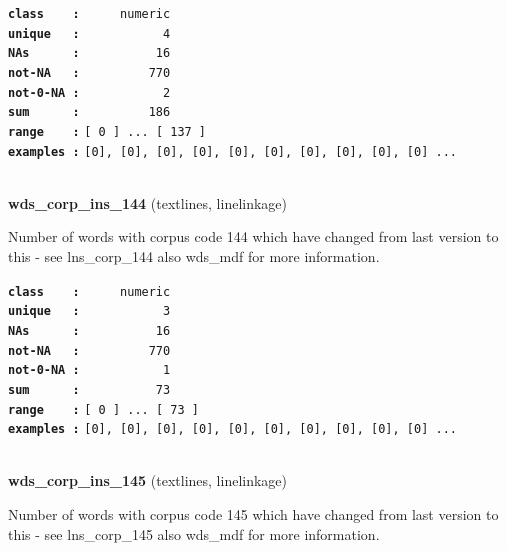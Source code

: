 \documentclass[]{article}
\begin{document}
\textbf{\texttt{class\ \ \ \ :}} \texttt{~~~~~numeric}\\
\textbf{\texttt{unique\ \ \ :}} \texttt{~~~~~~~~~~~4}\\
\textbf{\texttt{NAs\ \ \ \ \ \ :}} \texttt{~~~~~~~~~~16}\\
\textbf{\texttt{not-NA\ \ \ :}} \texttt{~~~~~~~~~770}\\
\textbf{\texttt{not-0-NA\ :}} \texttt{~~~~~~~~~~~2}\\
\textbf{\texttt{sum\ \ \ \ \ \ :}} \texttt{~~~~~~~~~186}\\
\textbf{\texttt{range\ \ \ \ :}}
\texttt{{[}\ 0\ {]}\ ...\ {[}\ 137\ {]}}\\
\textbf{\texttt{examples\ :}}
\texttt{{[}0{]},\ {[}0{]},\ {[}0{]},\ {[}0{]},\ {[}0{]},\ {[}0{]},\ {[}0{]},\ {[}0{]},\ {[}0{]},\ {[}0{]}\ ...}\\

~

\textbf{wds\_corp\_ins\_144} (textlines, linelinkage)

Number of words with corpus code 144 which have changed from last
version to this - see lns\_corp\_144 also wds\_mdf for more information.

\textbf{\texttt{class\ \ \ \ :}} \texttt{~~~~~numeric}\\
\textbf{\texttt{unique\ \ \ :}} \texttt{~~~~~~~~~~~3}\\
\textbf{\texttt{NAs\ \ \ \ \ \ :}} \texttt{~~~~~~~~~~16}\\
\textbf{\texttt{not-NA\ \ \ :}} \texttt{~~~~~~~~~770}\\
\textbf{\texttt{not-0-NA\ :}} \texttt{~~~~~~~~~~~1}\\
\textbf{\texttt{sum\ \ \ \ \ \ :}} \texttt{~~~~~~~~~~73}\\
\textbf{\texttt{range\ \ \ \ :}}
\texttt{{[}\ 0\ {]}\ ...\ {[}\ 73\ {]}}\\
\textbf{\texttt{examples\ :}}
\texttt{{[}0{]},\ {[}0{]},\ {[}0{]},\ {[}0{]},\ {[}0{]},\ {[}0{]},\ {[}0{]},\ {[}0{]},\ {[}0{]},\ {[}0{]}\ ...}\\

~

\textbf{wds\_corp\_ins\_145} (textlines, linelinkage)

Number of words with corpus code 145 which have changed from last
version to this - see lns\_corp\_145 also wds\_mdf for more information.
\end{document}
